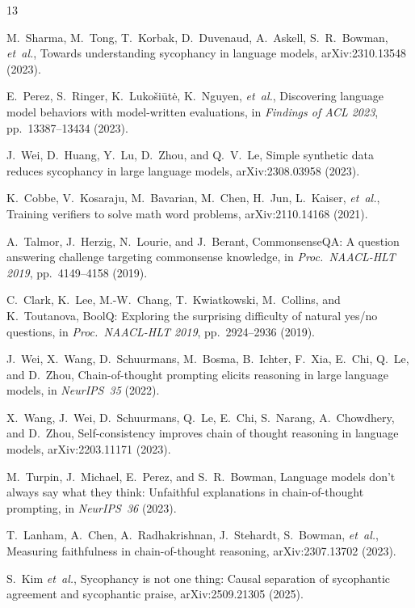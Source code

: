 \documentclass[aps,prx,reprint,twocolumn,superscriptaddress,longbibliography]{revtex4-2}
\begin{document}
\begin{thebibliography}{13}

M.~Sharma, M.~Tong, T.~Korbak, D.~Duvenaud, A.~Askell, S.~R.~Bowman, \emph{et~al.},
Towards understanding sycophancy in language models,
arXiv:2310.13548 (2023).

E.~Perez, S.~Ringer, K.~Luko\v{s}i\=ut\.e, K.~Nguyen, \emph{et~al.},
Discovering language model behaviors with model-written evaluations,
in \emph{Findings of ACL 2023}, pp.~13387--13434 (2023).

J.~Wei, D.~Huang, Y.~Lu, D.~Zhou, and Q.~V.~Le,
Simple synthetic data reduces sycophancy in large language models,
arXiv:2308.03958 (2023).

K.~Cobbe, V.~Kosaraju, M.~Bavarian, M.~Chen, H.~Jun, L.~Kaiser, \emph{et~al.},
Training verifiers to solve math word problems,
arXiv:2110.14168 (2021).

A.~Talmor, J.~Herzig, N.~Lourie, and J.~Berant,
CommonsenseQA: A question answering challenge targeting commonsense knowledge,
in \emph{Proc.\ NAACL-HLT 2019}, pp.~4149--4158 (2019).

C.~Clark, K.~Lee, M.-W.~Chang, T.~Kwiatkowski, M.~Collins, and K.~Toutanova,
BoolQ: Exploring the surprising difficulty of natural yes/no questions,
in \emph{Proc.\ NAACL-HLT 2019}, pp.~2924--2936 (2019).

J.~Wei, X.~Wang, D.~Schuurmans, M.~Bosma, B.~Ichter, F.~Xia, E.~Chi, Q.~Le, and D.~Zhou,
Chain-of-thought prompting elicits reasoning in large language models,
in \emph{NeurIPS~35} (2022).

X.~Wang, J.~Wei, D.~Schuurmans, Q.~Le, E.~Chi, S.~Narang, A.~Chowdhery, and D.~Zhou,
Self-consistency improves chain of thought reasoning in language models,
arXiv:2203.11171 (2023).

M.~Turpin, J.~Michael, E.~Perez, and S.~R.~Bowman,
Language models don't always say what they think: Unfaithful explanations in chain-of-thought prompting,
in \emph{NeurIPS~36} (2023).

T.~Lanham, A.~Chen, A.~Radhakrishnan, J.~Stehardt, S.~Bowman, \emph{et~al.},
Measuring faithfulness in chain-of-thought reasoning,
arXiv:2307.13702 (2023).

S.~Kim \emph{et~al.},
Sycophancy is not one thing: Causal separation of sycophantic agreement and sycophantic praise,
arXiv:2509.21305 (2025).


\end{thebibliography}
\end{document}
